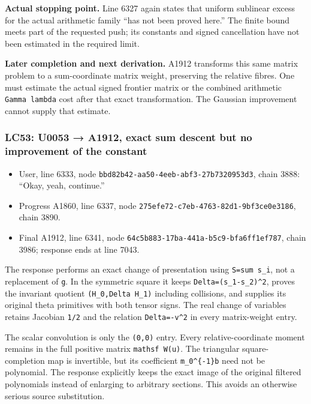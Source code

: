 \textbf{Actual stopping point.} Line 6327 again states that uniform
sublinear excess for the actual arithmetic family ``has not been proved
here.'' The finite bound meets part of the requested push; its constants
and signed cancellation have not been estimated in the required limit.

\textbf{Later completion and next derivation.} A1912 transforms this
same matrix problem to a sum-coordinate matrix weight, preserving the
relative fibres. One must estimate the actual signed frontier matrix or
the combined arithmetic \texttt{Gamma\ lambda} cost after that exact
transformation. The Gaussian improvement cannot supply that estimate.

\subsubsection{LC53: U0053 → A1912, exact sum descent but no improvement
of the
constant}\label{lc53-u0053-a1912-exact-sum-descent-but-no-improvement-of-the-constant}

\begin{itemize}
\tightlist
\item
  User, line 6333, node \texttt{bbd82b42-aa50-4eeb-abf3-27b7320953d3},
  chain 3888: ``Okay, yeah, continue.''
\item
  Progress A1860, line 6337, node
  \texttt{275efe72-c7eb-4763-82d1-9bf3ce0e3186}, chain 3890.
\item
  Final A1912, line 6341, node
  \texttt{64c5b883-17ba-441a-b5c9-bfa6ff1ef787}, chain 3986; response
  ends at line 7043.
\end{itemize}

The response performs an exact change of presentation using
\texttt{S=sum\ s\_i}, not a replacement of \texttt{g}. In the symmetric
square it keeps \texttt{Delta=(s\_1-s\_2)\^{}2}, proves the invariant
quotient \texttt{(H\_0,Delta\ H\_1)} including collisions, and supplies
its original theta primitives with both tensor signs. The real change of
variables retains Jacobian \texttt{1/2} and the relation
\texttt{Delta=-v\^{}2} in every matrix-weight entry.

The scalar convolution is only the \texttt{(0,0)} entry. Every
relative-coordinate moment remains in the full positive matrix
\texttt{mathsf\ W(u)}. The triangular square-completion map is
invertible, but its coefficient \texttt{m\_0\^{}\{-1\}b} need not be
polynomial. The response explicitly keeps the exact image of the
original filtered polynomials instead of enlarging to arbitrary
sections. This avoids an otherwise serious source substitution.

